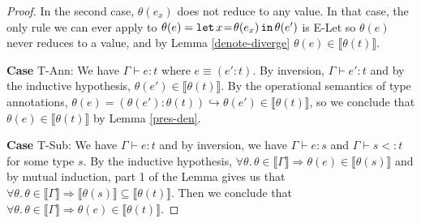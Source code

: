 \documentclass[11pt]{article}
\newcommand{\col}{\mathbin{:}}       %
\newcommand{\lb}{\llbracket}         %
\newcommand{\rb}{\rrbracket}         %
\newcommand{\step}{\hookrightarrow}
\newcommand{\foralltheta}{\forall\theta.\,\theta\in\lb\Gamma\rb}
\newcommand{\letin}[3]{{\tt let}\,#1\hspace{0.1em}{=}\hspace{0.1em}#2\,{\tt in}\,#3}
\begin{document}
\begin{proof}
In the second case, $\theta(e_x)$ does not reduce to any value. In that case, the only rule we can ever apply to $\theta(e) = \letin{x}{\theta(e_x)}{\theta(e')}$ is {\sc E-Let} so $\theta(e)$ never reduces to a value, and by Lemma \ref{denote-diverge} $\theta(e) \in \lb\theta(t)\rb$.

{\bf Case} {\sc T-Ann}: We have $\Gamma \vdash e : t$ where $e \equiv (e'\col t)$. By inversion, $\Gamma \vdash e' : t$ and by the inductive hypothesis, $\theta(e') \in \lb\theta(t)\rb$. By the operational semantics of type annotations, 
$\theta(e) = (\theta(e')\col\theta(t)) \step \theta(e') \in \lb\theta(t)\rb$, so we conclude that $\theta(e) \in \lb\theta(t)\rb$ by Lemma \ref{pres-den}.

{\bf Case} {\sc T-Sub}: We have $\Gamma \vdash e : t $ and by inversion, we have $\Gamma \vdash e : s$ and $\Gamma \vdash s <: t$ for some type $s$. 
By the inductive hypothesis, $\foralltheta \Rightarrow \theta(e) \in \lb\theta(s)\rb$ and by mutual induction, part 1 of the Lemma gives us that  $\foralltheta \Rightarrow \lb\theta(s)\rb \subseteq \lb\theta(t)\rb$. Then we conclude that $\foralltheta \Rightarrow \theta(e) \in \lb\theta(t)\rb$.
%
\end{proof}
\end{document}
